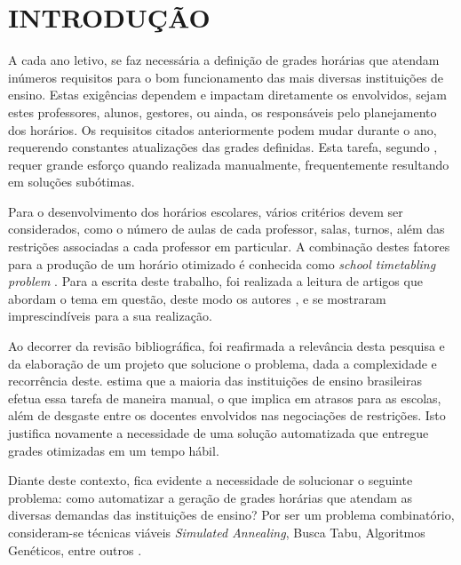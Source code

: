 
\chapter{INTRODUÇÃO}
\label{chap:introducao}

A cada ano letivo, se faz necessária a definição de grades horárias que atendam inúmeros requisitos para o bom funcionamento das mais diversas instituições de ensino. Estas exigências dependem e impactam diretamente os envolvidos, sejam estes professores, alunos, gestores, ou ainda, os responsáveis pelo planejamento dos horários. Os requisitos citados anteriormente podem mudar durante o ano, requerendo constantes atualizações das grades definidas. Esta tarefa, segundo , requer grande esforço quando realizada manualmente, frequentemente resultando em soluções subótimas.

Para o desenvolvimento dos horários escolares, vários critérios devem ser considerados, como o número de aulas de cada professor, salas, turnos, além das restrições associadas a cada professor em particular. A combinação destes fatores para a produção de um horário otimizado é conhecida como \textit{school timetabling problem} \cite{FONSECA2016108}. Para a escrita deste trabalho, foi realizada a leitura de artigos que abordam o tema em questão, deste modo os autores ,  e  se mostraram imprescindíveis para a sua realização.

Ao decorrer da revisão bibliográfica, foi reafirmada a relevância desta pesquisa e da elaboração de um projeto que solucione o problema, dada a complexidade e recorrência deste.  estima que a maioria das instituições de ensino brasileiras efetua essa tarefa de maneira manual, o que implica em atrasos para as escolas, além de desgaste entre os docentes envolvidos nas negociações de restrições. Isto justifica novamente a necessidade de uma solução automatizada que entregue grades otimizadas em um tempo hábil.

Diante deste contexto, fica evidente a necessidade de solucionar o seguinte problema: como automatizar a geração de grades horárias que atendam as diversas demandas das instituições de ensino? Por ser um problema combinatório, consideram-se técnicas viáveis \textit{Simulated Annealing}, Busca Tabu, Algoritmos Genéticos, entre outros \cite{TAN2021113943}.

